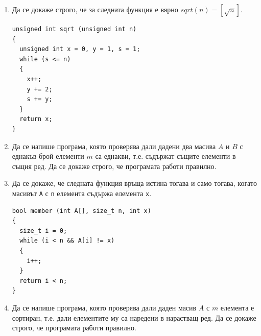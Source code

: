\documentclass[12pt,a4paper]{article}
\newcommand{\code}[1]{\texttt{#1}}
\begin{document}
{\begin{enumerate}[resume]
\begin{enumerate}[label=\alph*)]
    \item
\begin{verbatim}
unsigned int pow (unsigned int x, usnigned int y)
{
  unsigned int p = 1, i = 0;
  while (i < y)
  {
    p *= x;
    i++;
  }
  return p;
}
\end{verbatim}
    \item
\begin{verbatim}
unsigned int pow (unsigned int x, usnigned int y)
{
  unsigned int p = 1;
  while (y > 0)
  {
    p *= x;
    y--;
  }
  return p;
}
\end{verbatim}
      \item
\begin{verbatim}
unsigned int pow (unsigned int x, usnigned int y)
{
  unsigned int z = x, t = y, p = 1;
  while (t > 0)
  {
    if (t%2 == 0)
    {
      z *= z;
      t /= 2;
    }else{
      t = t - 1;
      p *= z;
    }
  }
  return p;
}
\end{verbatim}
  \end{enumerate}

  \item Да се докаже строго, че за следната функция е вярно $sqrt(n)=[\sqrt{n}]$.

\begin{verbatim}
unsigned int sqrt (unsigned int n)
{
  unsigned int x = 0, y = 1, s = 1;
  while (s <= n)
  {
    x++;
    y += 2;
    s += y;
  }
  return x;
}
\end{verbatim}

\item Да се напише програма, която проверява дали дадени два масива $A$ и $B$ с еднакъв брой елементи $m$ са еднакви, т.е. съдържат същите елементи в същия ред. Да се докаже строго, че програмата работи правилно.

\item Да се докаже, че следната функция връща истина тогава и само тогава, когато масивът \code{A} с \code{n} елемента съдържа елемента \code{x}.

\begin{verbatim}
bool member (int A[], size_t n, int x)
{
  size_t i = 0;
  while (i < n && A[i] != x)
  {
    i++;
  }
  return i < n;
}
\end{verbatim}

\item Да се напише програма, която проверява дали даден масив $A$ с $m$ елемента е сортиран, т.е. дали елементите му са наредени в нарастващ ред. Да се докаже строго, че програмата работи правилно.


\end{enumerate}}
\end{document}
